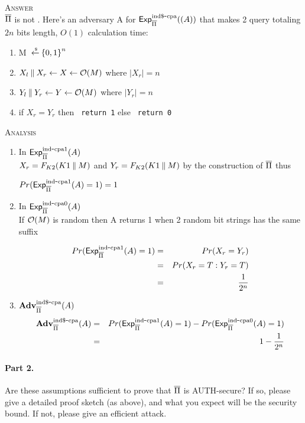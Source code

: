 \documentclass[11pt]{article}
\begin{document}
\textsc{Answer} 
\\$\overline{\Pi}$ is not \INDR. Here's an adversary A for $\mathsf{Exp}^{\mathrm{ind\$}\mbox{-}\mathrm{cpa}}_{\overline{\Pi}}{((A))}$ that makes 2 query totaling $2n$ bits length, $O(1)$ calculation time:
\begin{enumerate}
\item M ${\:\stackrel{{\scriptscriptstyle \hspace{0.2em}\$}} {\leftarrow}\:} {\{0,1\}}^n$
\item $X_l \:\|\: X_r \gets X \gets {\cal O}(M)$ where $|X_r| = n$
\item $Y_l \:\|\: Y_r \gets Y \gets {\cal O}(M)$ where $|Y_r| = n$
\item if $X_r = Y_r$ then \texttt{ return 1} else \texttt{ return 0}
\end{enumerate}

\textsc{Analysis}\\
\begin{enumerate}
\item In $\mathsf{Exp}^{\mathrm{ind}\mbox{-}\mathrm{cpa1}}_{\overline{\Pi}}{(A)}$\\
$X_r = F_{K2}(K1 \:\|\: M)$ and $Y_r = F_{K2}(K1 \:\|\: M)$ by the construction of $\overline{\Pi}$ thus\\
\begin{center}
 $Pr(\mathsf{Exp}^{\mathrm{ind}\mbox{-}\mathrm{cpa1}}_{\overline{\Pi}}{(A)}=1) =1$
\end{center}

\item In $\mathsf{Exp}^{\mathrm{ind}\mbox{-}\mathrm{cpa0}}_{\overline{\Pi}}{(A)}$\\
If ${\cal O} (M)$ is random then A returns 1 when 2 random bit strings has the same suffix 

\begin{eqnarray*}
Pr(\mathsf{Exp}^{\mathrm{ind}\mbox{-}\mathrm{cpa1}}_{\overline{\Pi}}{(A)}=1) &=& Pr (X_r = Y_r)\\
&=& Pr (X_r = T: Y_r = T)\\
&=& \frac{1}{2^n}
\end{eqnarray*}

\item ${\mathbf{\bf Adv}}^{\mathrm{ind\$}\mbox{-}\mathrm{cpa}}_{\overline{\Pi}}(A)$\\

\begin{eqnarray*}
{\mathbf{\bf Adv}}^{\mathrm{ind\$}\mbox{-}\mathrm{cpa}}_{\overline{\Pi}}(A) &=& Pr(\mathsf{Exp}^{\mathrm{ind}\mbox{-}\mathrm{cpa1}}_{\overline{\Pi}}{(A)}=1)-Pr(\mathsf{Exp}^{\mathrm{ind}\mbox{-}\mathrm{cpa0}}_{\overline{\Pi}}{(A)}=1)\\
&=& 1 - \frac{1}{2^n}
\end{eqnarray*}

\end{enumerate}

\paragraph{Part 2.} Are these assumptions sufficient to prove that $\overline{\Pi}$ is AUTH-secure?
If so, please give a detailed proof sketch (as above), and what you
expect will be the security bound.  If not, please give an efficient attack.
\end{document}
